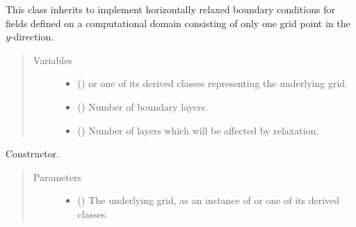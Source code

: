 \documentclass[letterpaper,10pt,english]{sphinxmanual}
\begin{document}
\begin{fulllineitems}
\label{\detokenize{api:tasmania.dycore.horizontal_boundary_relaxed.RelaxedXZ}}
This class inherits {\hyperref[\detokenize{api:tasmania.dycore.horizontal_boundary.HorizontalBoundary}]{}} to implement horizontally
relaxed boundary conditions for fields defined on a computational domain consisting of only one grid point
in the \(y\)-direction.
\begin{quote}\begin{description}
\item[{Variables}] \leavevmode\begin{itemize}
\item {} 
 () \textendash{} {\hyperref[\detokenize{api:tasmania.grids.grid_xyz.GridXYZ}]{}} or one of its derived classes representing the underlying grid.

\item {} 
{\hyperref[\detokenize{api:tasmania.dycore.prognostic_isentropic.PrognosticIsentropic.nb}]{}} () \textendash{} Number of boundary layers.

\item {} 
 () \textendash{} Number of layers which will be affected by relaxation.

\end{itemize}

\end{description}\end{quote}

\begin{fulllineitems}
\label{\detokenize{api:tasmania.dycore.horizontal_boundary_relaxed.RelaxedXZ.__init__}}
Constructor.
\begin{quote}\begin{description}
\item[{Parameters}] \leavevmode\begin{itemize}
\item {} 
 () \textendash{} The underlying grid, as an instance of {\hyperref[\detokenize{api:tasmania.grids.grid_xyz.GridXYZ}]{}} or one of its derived classes.


\end{itemize}
\end{description}
\end{quote}
\end{fulllineitems}
\end{fulllineitems}
\end{document}
